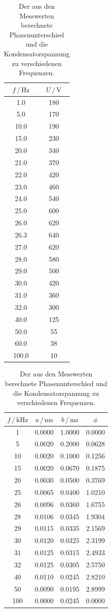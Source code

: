 \begin{table}
\centering
\caption{Der aus den Messwerten berechnete Phasenunterschied und die Kondensatorspannung zu verschiedenen Frequenzen.}
\begin{tabular}[t]{cc|}
    \toprule
    $f \, / \, \si{\hertz}$ & $U \, / \, \si{\V}$\\
    \midrule
    1.0& 180    \\
    5.0& 170\\
    10.0& 190\\
    15.0& 230\\
    20.0& 340\\
    21.0& 370\\
    22.0& 420\\
    23.0& 460\\
    24.0& 540\\
    25.0& 600\\
    26.0& 620\\
    26.3& 640\\
    27.0& 620\\
    28.0& 580\\
    29.0& 500\\
    30.0& 420\\
    31.0& 360\\
    32.0& 300\\
    40.0& 125\\
    50.0& 55\\
    60.0& 38\\
    100.0& 10\\
    \bottomrule
\end{tabular}
\begin{tabular}[t]{|cccc}
    \toprule
    $f \,/\, \si{\kilo\hertz}$ & $a \,/\, \si{\milli\second}$ &  $b \,/\, \si{\milli\second}$ & $\phi$\\
    \midrule
    1& 0.0000& 1.0000& 0.0000\\
    5& 0.0020& 0.2000& 0.0628\\
    10& 0.0020& 0.1000&  0.1256\\
    15& 0.0020& 0.0670& 0.1875 \\
    20& 0.0030& 0.0500&  0.3769\\
    25& 0.0065& 0.0400&  1.0210\\
    26& 0.0096& 0.0360&  1.6755\\
    28& 0.0106& 0.0345& 1.9304 \\
    29& 0.0115& 0.0335& 2.1569\\
    30& 0.0120& 0.0325&  2.3199\\
    31& 0.0125& 0.0315 & 2.4933\\
    32& 0.0125& 0.0305& 2.5750\\
    40& 0.0110& 0.0245& 2.8210\\
    50& 0.0090& 0.0195& 2.8999\\
    100&0.0000& 0.0245& 0.0000\\
    \bottomrule
\end{tabular}
\label{tab:phase}
\end{table}

